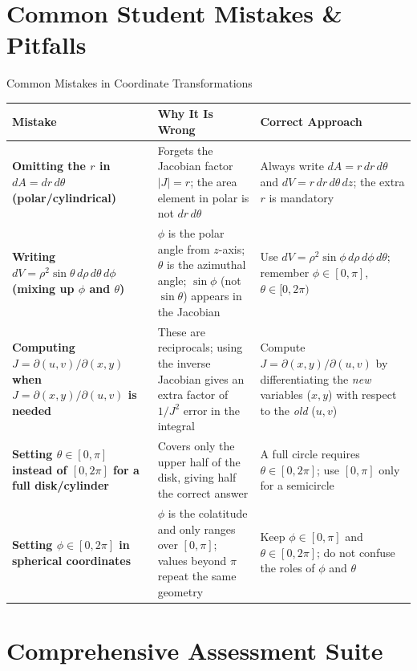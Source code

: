 \documentclass[12pt,a4paper]{article}
\begin{document}
\section{Common Student Mistakes \& Pitfalls}

\begin{mistakebox}{Common Mistakes in Coordinate Transformations}
\begin{tabular}{>{\bfseries}p{4.5cm} p{4.5cm} p{5cm}}
\toprule
\textbf{Mistake} & \textbf{Why It Is Wrong} & \textbf{Correct Approach} \\
\midrule
Omitting the $r$ in $dA = dr\,d\theta$ (polar/cylindrical) &
  Forgets the Jacobian factor $|J|=r$; the area element in polar is not $dr\,d\theta$ &
  Always write $dA = r\,dr\,d\theta$ and $dV = r\,dr\,d\theta\,dz$; the extra $r$ is mandatory \\
\addlinespace
Writing $dV = \rho^2\sin\theta\,d\rho\,d\theta\,d\phi$ (mixing up $\phi$ and $\theta$) &
  $\phi$ is the polar angle from $z$-axis; $\theta$ is the azimuthal angle; $\sin\phi$ (not $\sin\theta$) appears in the Jacobian &
  Use $dV = \rho^2\sin\phi\,d\rho\,d\phi\,d\theta$; remember $\phi \in [0,\pi]$, $\theta \in [0,2\pi)$ \\
\addlinespace
Computing $J = \partial(u,v)/\partial(x,y)$ when $J = \partial(x,y)/\partial(u,v)$ is needed &
  These are reciprocals; using the inverse Jacobian gives an extra factor of $1/J^2$ error in the integral &
  Compute $J = \partial(x,y)/\partial(u,v)$ by differentiating the \emph{new} variables ($x,y$) with respect to the \emph{old} ($u,v$) \\
\addlinespace
Setting $\theta \in [0, \pi]$ instead of $[0, 2\pi]$ for a full disk/cylinder &
  Covers only the upper half of the disk, giving half the correct answer &
  A full circle requires $\theta \in [0, 2\pi]$; use $[0,\pi]$ only for a semicircle \\
\addlinespace
Setting $\phi \in [0, 2\pi]$ in spherical coordinates &
  $\phi$ is the colatitude and only ranges over $[0,\pi]$; values beyond $\pi$ repeat the same geometry &
  Keep $\phi \in [0,\pi]$ and $\theta \in [0,2\pi]$; do not confuse the roles of $\phi$ and $\theta$ \\
\bottomrule
\end{tabular}
\end{mistakebox}

\section{Comprehensive Assessment Suite}
\end{document}
